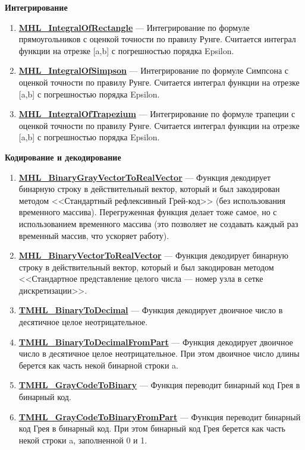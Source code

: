 \documentclass[a4paper,12pt]{article}
\begin{document}
\textbf{Интегрирование}
\begin{enumerate}

\item \textbf{\hyperref[MHL_IntegralOfRectangle]{MHL\_IntegralOfRectangle}} --- Интегрирование по формуле прямоугольников с оценкой точности по правилу Рунге. Считается интеграл функции на отрезке [a,b] с погрешностью порядка Epsilon.

\item \textbf{\hyperref[MHL_IntegralOfSimpson]{MHL\_IntegralOfSimpson}} --- Интегрирование по формуле Симпсона с оценкой точности по правилу Рунге. Считается интеграл функции на отрезке [a,b] с погрешностью порядка Epsilon.

\item \textbf{\hyperref[MHL_IntegralOfTrapezium]{MHL\_IntegralOfTrapezium}} --- Интегрирование по формуле трапеции с оценкой точности по правилу Рунге. Считается интеграл функции на отрезке [a,b] с погрешностью порядка Epsilon.

\end{enumerate}

\textbf{Кодирование и декодирование}
\begin{enumerate}

\item \textbf{\hyperref[MHL_BinaryGrayVectorToRealVector]{MHL\_BinaryGrayVectorToRealVector}} --- Функция декодирует бинарную строку в действительный вектор, который и был закодирован методом <<Стандартный рефлексивный Грей-код>> (без использования временного массива). Перегруженная функция делает тоже самое, но с использованием временного массива (это позволяет не создавать каждый раз временный массив, что ускоряет работу).

\item \textbf{\hyperref[MHL_BinaryVectorToRealVector]{MHL\_BinaryVectorToRealVector}} --- Функция декодирует бинарную строку в действительный вектор, который и был закодирован методом <<Стандартное представление целого числа --- номер узла в сетке дискретизации>>.

\item \textbf{\hyperref[TMHL_BinaryToDecimal]{TMHL\_BinaryToDecimal}} --- Функция декодирует двоичное число в десятичное целое неотрицательное.

\item \textbf{\hyperref[TMHL_BinaryToDecimalFromPart]{TMHL\_BinaryToDecimalFromPart}} --- Функция декодирует двоичное число в десятичное целое неотрицательное. При этом двоичное число длины  берется как часть некой бинарной строки a.

\item \textbf{\hyperref[TMHL_GrayCodeToBinary]{TMHL\_GrayCodeToBinary}} --- Функция переводит бинарный код Грея в бинарный код.

\item \textbf{\hyperref[TMHL_GrayCodeToBinaryFromPart]{TMHL\_GrayCodeToBinaryFromPart}} --- Функция переводит бинарный код Грея в бинарный код. При этом бинарный код Грея берется как часть некой строки a, заполненной 0 и 1.

\end{enumerate}
\end{document}
